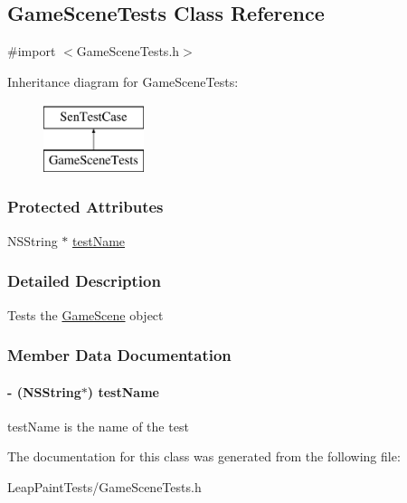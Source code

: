 \hypertarget{interface_game_scene_tests}{\subsection{Game\-Scene\-Tests Class Reference}
\label{d5/def/interface_game_scene_tests}
}


{\ttfamily \#import $<$Game\-Scene\-Tests.\-h$>$}

Inheritance diagram for Game\-Scene\-Tests\-:\begin{figure}[H]
\begin{center}
\leavevmode
\includegraphics[height=2.000000cm]{d5/def/interface_game_scene_tests}
\end{center}
\end{figure}
\subsubsection*{Protected Attributes}
\begin{DoxyCompactItemize}
\item 
N\-S\-String $\ast$ \hyperlink{interface_game_scene_tests_aeb2444f62163919383f597cfbfaa3606}{test\-Name}
\end{DoxyCompactItemize}


\subsubsection{Detailed Description}
Tests the \hyperlink{interface_game_scene}{Game\-Scene} object 

\subsubsection{Member Data Documentation}
\hypertarget{interface_game_scene_tests_aeb2444f62163919383f597cfbfaa3606}{
\paragraph[{test\-Name}]{\setlength{\rightskip}{0pt plus 5cm}-\/ (N\-S\-String$\ast$) test\-Name\hspace{0.3cm}{\ttfamily [protected]}}}\label{d5/def/interface_game_scene_tests_aeb2444f62163919383f597cfbfaa3606}
test\-Name is the name of the test 

The documentation for this class was generated from the following file\-:\begin{DoxyCompactItemize}
\item 
Leap\-Paint\-Tests/Game\-Scene\-Tests.\-h\end{DoxyCompactItemize}
